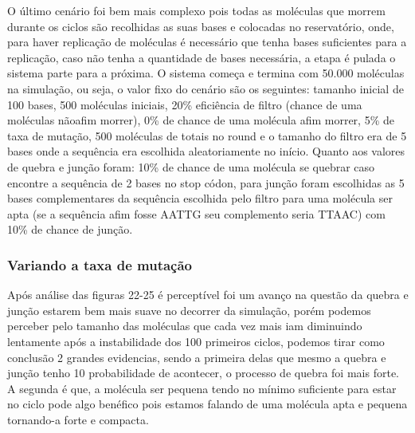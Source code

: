 O último cenário foi bem mais complexo pois todas as moléculas que morrem
durante os ciclos são recolhidas as suas bases e colocadas no reservatório, onde, para
haver replicação de moléculas é necessário que tenha bases suficientes para a
replicação, caso não tenha a quantidade de bases necessária, a etapa é pulada o sistema
parte para a próxima. O sistema começa e termina com 50.000 moléculas na
simulação, ou seja, o valor fixo do cenário são os seguintes: tamanho inicial de 100
bases, 500 moléculas iniciais, 20\% eficiência de filtro (chance de uma moléculas nãoafim morrer), 0\% de chance de uma molécula afim morrer, 5\% de taxa de mutação,
500 moléculas de totais no round e o tamanho do filtro era de 5 bases onde a sequência
era escolhida aleatoriamente no início. Quanto aos valores de quebra e junção foram:
10\% de chance de uma molécula se quebrar caso encontre a sequência de 2 bases no
stop códon, para junção foram escolhidas as 5 bases complementares da sequência
escolhida pelo filtro para uma molécula ser apta (se a sequência afim fosse AATTG
seu complemento seria TTAAC) com 10\% de chance de junção.

\subsubsection{Variando a taxa de mutação}



Após análise das figuras 22-25 é perceptível foi um avanço na questão da quebra
e junção estarem bem mais suave no decorrer da simulação, porém podemos perceber
pelo tamanho das moléculas que cada vez mais iam diminuindo lentamente após a
instabilidade dos 100 primeiros ciclos, podemos tirar como conclusão 2 grandes
evidencias, sendo a primeira delas que mesmo a quebra e junção tenho 10%
probabilidade de acontecer, o processo de quebra foi mais forte. A segunda é que, a
molécula ser pequena tendo no mínimo suficiente para estar no ciclo pode algo benéfico
pois estamos falando de uma molécula apta e pequena tornando-a forte e compacta.

